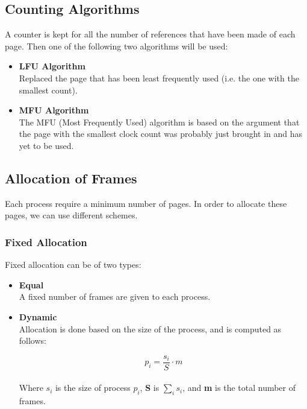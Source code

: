 \documentclass{article}
\begin{document}
\subsection{Counting Algorithms}
A counter is kept for all the number of references that have been made of each page. Then one of the following two algorithms will be used:

\begin{itemize}
	\item \textbf{LFU Algorithm}
	\vspace{.2cm} \\
	Replaced the page that has been least frequently used (i.e. the one with the smallest count).
	
	\item \textbf{MFU Algorithm}
	\vspace{.2cm} \\
	The MFU (Most Frequently Used) algorithm is based on the argument that the page with the smallest clock count was probably just brought in and has yet to be used.
\end{itemize}

\subsection{Allocation of Frames}
Each process require a minimum number of pages. In order to allocate these pages, we can use different schemes.

\subsubsection{Fixed Allocation}
Fixed allocation can be of two types:

\begin{itemize}
	\item \textbf{Equal}
	\vspace{.2cm} \\
	A fixed number of frames are given to each process.
	
	\item \textbf{Dynamic}
	\vspace{.2cm} \\
	Allocation is done based on the size of the process, and is computed as follows:
	
	\[ p_i = \frac{s_i}{S} \cdot m \] \\
	Where $s_i$ is the size of process $p_i$, \textbf{S} is $\sum_i s_i$, and \textbf{m} is the total number of frames.
\end{itemize}
\end{document}
